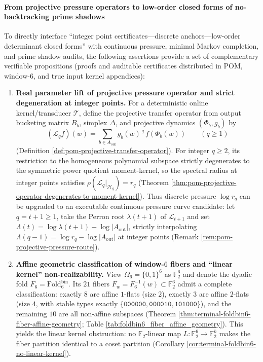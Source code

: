 \paragraph{From projective pressure operators to low-order closed forms of no-backtracking prime shadows}
To directly interface ``integer point certificates---discrete anchors---low-order determinant closed forms'' with continuous pressure, minimal Markov completion, and prime shadow audits, the following assertions provide a set of complementary verifiable propositions (proofs and auditable certificates distributed in POM, window-\(6\), and true input kernel appendices):
\begin{enumerate}
  \item \textbf{Real parameter lift of projective pressure operator and strict degeneration at integer points.}
  For a deterministic online kernel/transducer \(\mathcal{T}\), define the projective transfer operator from output bucketing matrix \(B_b\), simplex \(\Delta\), and projective dynamics \((\Phi_b,g_b)\) by
  \[
  (\mathcal{L}_q f)(w)=\sum_{b\in A_{\mathrm{out}}} g_b(w)^{\,q}\,f(\Phi_b(w))\qquad (q\ge 1)
  \]
  (Definition \ref{def:pom-projective-transfer-operator}).
  For integer \(q\ge 2\), its restriction to the homogeneous polynomial subspace strictly degenerates to the symmetric power quotient moment-kernel, so the spectral radius at integer points satisfies
  \(
  \rho(\mathcal{L}_q|_{\mathcal{H}_q})=r_q
  \)
  (Theorem \ref{thm:pom-projective-operator-degenerates-to-moment-kernel}).
  Thus discrete pressure \(\log r_q\) can be upgraded to an executable continuous pressure curve candidate: let \(q=t+1\ge 1\), take the Perron root \(\lambda(t+1)\) of \(\mathcal{L}_{t+1}\) and set \(\Lambda(t)=\log\lambda(t+1)-\log|A_{\mathrm{out}}|\), strictly interpolating \(\Lambda(q-1)=\log r_q-\log|A_{\mathrm{out}}|\) at integer points (Remark \ref{rem:pom-projective-pressure-route}).

  \item \textbf{Affine geometric classification of window-\(6\) fibers and ``linear kernel'' non-realizability.}
  View \(\Omega_6=\{0,1\}^6\) as \(\mathbb{F}_2^6\) and denote the dyadic fold \(F_6=\mathrm{Fold}^{\mathrm{bin}}_6\).
  Its \(21\) fibers \(F_w=F_6^{-1}(w)\subset\mathbb{F}_2^6\) admit a complete classification: exactly \(8\) are affine \(1\)-flats (size \(2\)), exactly \(3\) are affine \(2\)-flats (size \(4\), with stable types exactly \(\{\texttt{000000},\texttt{000010},\texttt{101000}\}\)), and the remaining \(10\) are all non-affine subspaces (Theorem \ref{thm:terminal-foldbin6-fiber-affine-geometry}; Table \ref{tab:foldbin6_fiber_affine_geometry}).
  This yields the linear kernel obstruction: no \(\mathbb{F}_2\)-linear map \(L:\mathbb{F}_2^6\to\mathbb{F}_2^k\) makes the fiber partition identical to a coset partition (Corollary \ref{cor:terminal-foldbin6-no-linear-kernel}).


\end{enumerate}
